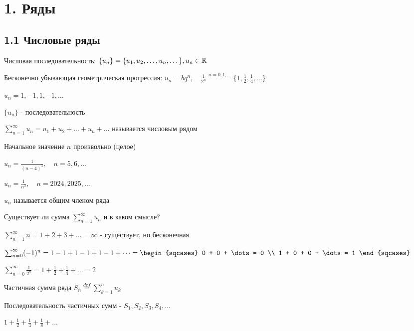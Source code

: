 \documentclass[12pt]{article}
\begin{document}
    \section{1. Ряды}

    \subsection{1.1 Числовые ряды}


    \Mems Числовая последовательность: $\{u_n\} = \{u_1, u_2, \dots, u_n, \dots\}, u_n \in \mathbb{R}$

     Бесконечно убывающая геометрическая прогрессия: $u_n = b q^n, \quad
    \frac{1}{2^n} \stackrel{n = 0,1,\dots}{=} \{1, \frac{1}{2}, \frac{1}{4}, \dots\}$

     $u_n = 1, -1, 1, -1, \dots$

    \Def $\{u_n\}$ - последовательность

    $\sum_{n = 1}^{\infty} u_n = u_1 + u_2 + \dots + u_n + \dots$ называется числовым рядом

    \Notas Начальное значение $n$ произвольно (целое)

    \Ex $u_n = \frac{1}{(n - 4)^3}, \quad n = 5, 6, \dots$

    $u_n = \frac{1}{n^3}, \quad n = 2024, 2025, \dots$

    \Notas $u_n$ называется общим членом ряда

    \Nota Существует ли сумма $\sum_{n = 1}^{\infty} u_n$ и в каком смысле?

     $\sum_{n = 1}^{\infty} n = 1 + 2 + 3 + \dots = \infty$ - существует, но бесконечная

     $\sum_{n = 0}^{\infty} (-1)^n = 1 - 1 + 1 - 1 + 1 - 1 + \dots =
    \begin{sqcases}
        0 + 0 + \dots = 0 \\
        1 + 0 + 0 + \dots = 1
    \end{sqcases}$

     $\sum_{n = 0}^\infty \frac{1}{2^n} = 1 + \frac{1}{2} + \frac{1}{4} + \dots = 2$

    \Def Частичная сумма ряда $S_n \stackrel{def}{=} \sum_{k = 1}^{n} u_k$

    \Notas Последовательность частичных сумм - $S_1, S_2, S_3, S_4, \dots$

    \Ex $1 + \frac{1}{2} + \frac{1}{4} + \frac{1}{8} + \dots$
\end{document}
